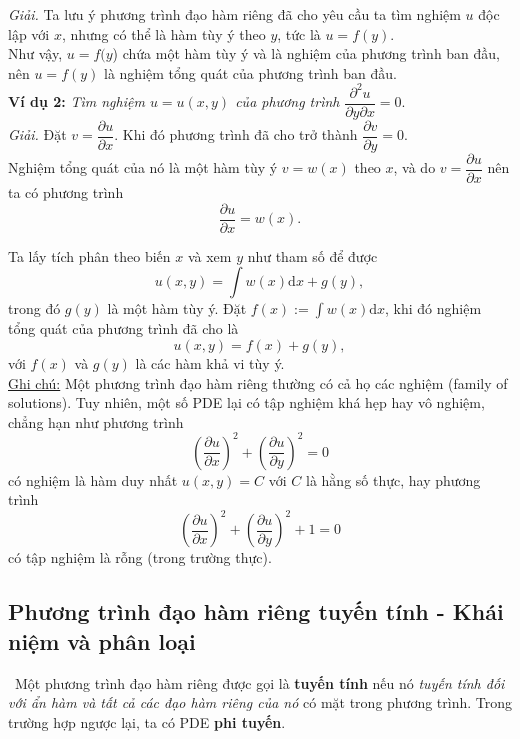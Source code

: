 \documentclass[10pt, a4paper]{article}
\begin{document}
	\textit{Giải.} Ta lưu ý phương trình đạo hàm riêng đã cho yêu cầu ta tìm nghiệm $u$ độc lập với $x$, nhưng có thể là hàm tùy ý theo $y$, tức là $u = f(y)$.\\
	
	Như vậy, $u = f(y$) chứa một hàm tùy ý và là nghiệm của phương trình ban đầu, nên $u = f(y)$ là nghiệm tổng quát của phương trình ban đầu.\\
	
	\textbf{Ví dụ 2:} \textit{Tìm nghiệm $u=u(x,y)$ của phương trình} $\dfrac{\partial^2u}{\partial y\partial x}=0$.\\
	
	\textit{Giải.} Đặt $v=\dfrac{\partial u}{\partial x}$. Khi đó phương trình đã cho trở thành $\dfrac{\partial v}{\partial y}=0$.\\
	
	Nghiệm tổng quát của nó là một hàm tùy ý $v=w(x)$ theo $x$, và do $v=\dfrac{\partial u}{\partial x}$ nên ta có phương trình $$\dfrac{\partial u}{\partial x}=w(x).$$
	
	Ta lấy tích phân theo biến $x$ và xem $y$ như tham số để được $$u(x,y)=\int w(x)\mathrm dx+g(y),$$
	trong đó $g(y)$ là một hàm tùy ý. Đặt $f(x):=\displaystyle\int w(x)\mathrm dx$, khi đó nghiệm tổng quát của phương trình đã cho là $$u(x,y)=f(x)+g(y),$$
	với $f(x)$ và $g(y)$ là các hàm khả vi tùy ý.\\
	
	\underline{Ghi chú:} Một phương trình đạo hàm riêng thường có cả họ các nghiệm (family of solutions). Tuy nhiên, một số PDE lại có tập nghiệm khá hẹp hay vô nghiệm, chẳng hạn như phương trình $$\left(\frac{\partial u}{\partial x}\right)^2+\left(\frac{\partial u}{\partial y}\right)^2=0$$
	có nghiệm là hàm duy nhất $u(x,y)=C$ với $C$ là hằng số thực, hay phương trình $$\left(\frac{\partial u}{\partial x}\right)^2+\left(\frac{\partial u}{\partial y}\right)^2+1=0$$
	có tập nghiệm là rỗng (trong trường thực).
	\subsection{Phương trình đạo hàm riêng tuyến tính - Khái niệm và phân loại}
	\vspace{2mm}
	\quad\,\,\,Một phương trình đạo hàm riêng được gọi là \textbf{\color{red}tuyến tính} nếu nó \textit{tuyến tính đối với ẩn hàm và tất cả các đạo hàm riêng của nó} có mặt trong phương trình. Trong trường hợp ngược lại, ta có PDE \textbf{\color{red}phi tuyến}.\\
	
\end{document}
